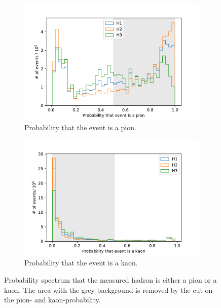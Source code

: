 \begin{figure}[H]
    \centering
    \begin{subfigure}{0.49\textwidth}
      \includegraphics[width=\textwidth]{plots/ProbPi.pdf}
      \caption{Probability that the event is a pion.}
      \label{fig:ProbPi}
    \end{subfigure}
    \begin{subfigure}{0.49\textwidth}
      \includegraphics[width=\textwidth]{plots/ProbK.pdf}
      \caption{Probability that the event is a kaon.}
      \label{fig:ProbK}
    \end{subfigure}
    \caption{Probability spectrum that the measured hadron is either a pion or a kaon. 
    The area with the grey background is removed by the cut on the pion- and kaon-probability.}
    \label{f3}
\end{figure}

